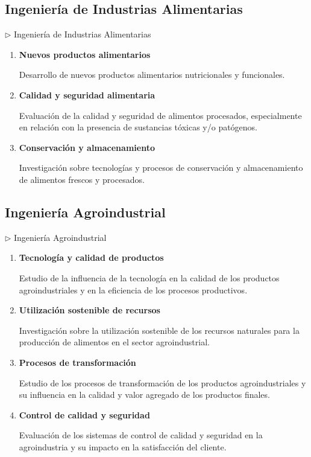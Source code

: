\documentclass[12pt,a4paper]{article}
\begin{document}
\subsection{Ingeniería de Industrias Alimentarias}

\begin{careerbox}{$\triangleright$ Ingeniería de Industrias Alimentarias}
	\begin{enumerate}
		\item \textbf{Nuevos productos alimentarios}
		
		Desarrollo de nuevos productos alimentarios nutricionales y funcionales.
		
		\item \textbf{Calidad y seguridad alimentaria}
		
		Evaluación de la calidad y seguridad de alimentos procesados, especialmente en relación con la presencia de sustancias tóxicas y/o patógenos.
		
		\item \textbf{Conservación y almacenamiento}
		
		Investigación sobre tecnologías y procesos de conservación y almacenamiento de alimentos frescos y procesados.
	\end{enumerate}
\end{careerbox}


\subsection{Ingeniería Agroindustrial}

\begin{careerbox}{$\triangleright$ Ingeniería Agroindustrial}
	\begin{enumerate}
		\item \textbf{Tecnología y calidad de productos}
		
		Estudio de la influencia de la tecnología en la calidad de los productos agroindustriales y en la eficiencia de los procesos productivos.
		
		\item \textbf{Utilización sostenible de recursos}
		
		Investigación sobre la utilización sostenible de los recursos naturales para la producción de alimentos en el sector agroindustrial.
		
		\item \textbf{Procesos de transformación}
		
		Estudio de los procesos de transformación de los productos agroindustriales y su influencia en la calidad y valor agregado de los productos finales.
		
		\item \textbf{Control de calidad y seguridad}
		
		Evaluación de los sistemas de control de calidad y seguridad en la agroindustria y su impacto en la satisfacción del cliente.
	\end{enumerate}
\end{careerbox}
\end{document}
